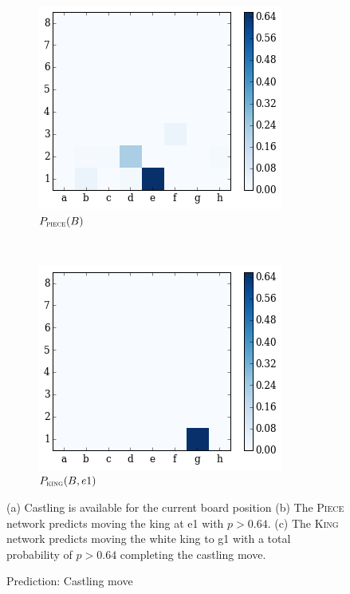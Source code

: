 \begin{figure}[H]
 \hspace*{-0.5in}  
    \begin{subfigure}[t]{0.5\textwidth}
        \centering
        \includegraphics[width=\textwidth]{img/best_moves/output_22_2.png}
        \caption{$P_{\textsc{piece}}(B)$}
    \end{subfigure}
    ~
  \centering
    \begin{subfigure}[t]{0.5\textwidth}
        \centering
        \includegraphics[width=\textwidth]{img/best_moves/output_22_6.png}
        \caption{$P_{\textsc{king}}(B, e1)$}
    \end{subfigure}%
    \caption{Prediction: Castling move}
    \small
    \justifying
    (a) Castling is available for the current board position (b) The 
\textsc{Piece} network predicts moving the king at e1 with $p>0.64$. (c) The 
\textsc{King} network predicts moving the white king to g1 with a total 
probability of $p>0.64$ completing the castling move.
\label{figure:castling}
\end{figure}

